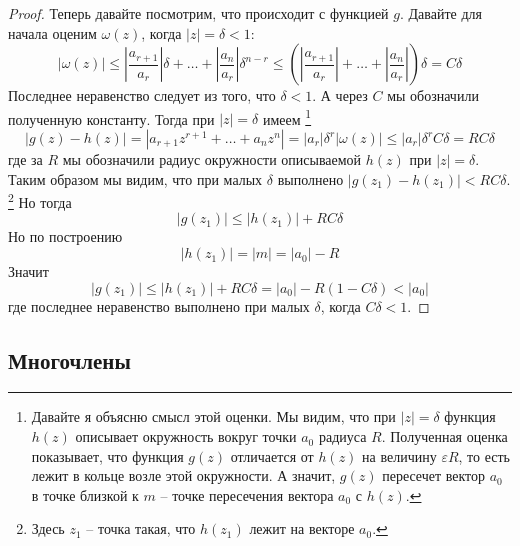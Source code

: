 \begin{proof}
Теперь давайте посмотрим, что происходит с функцией $g$.
Давайте для начала оценим $\omega(z)$, когда $|z| = \delta < 1$:
\[
|\omega(z)| \leqslant \left| \frac{a_{r+1}}{a_r}\right| \delta + \ldots + \left|\frac{a_n}{a_r}\right| 
\delta^{n-r}\leqslant \left(\left| \frac{a_{r+1}}{a_r}\right|  + \ldots + \left|\frac{a_n}{a_r}\right|\right) 
\delta = C \delta
\]
Последнее неравенство следует из того, что $\delta < 1$.
А через $C$ мы обозначили полученную константу.
Тогда при $|z| = \delta$ имеем%
\footnote{Давайте я объясню смысл этой оценки.
Мы видим, что при $|z| = \delta$ функция $h(z)$ описывает окружность вокруг точки $a_0$ радиуса $R$.
Полученная оценка показывает, что функция $g(z)$ отличается от $h(z)$ на величину $\varepsilon R$, то есть лежит в кольце возле этой окружности.
А значит, $g(z)$ пересечет вектор $a_0$ в точке близкой к $m$ -- точке пересечения вектора $a_0$ с $h(z)$.}
\[
|g(z) - h(z)| = \left|a_{r+1}z^{r+1} + \ldots + a_n z^n \right|= |a_r|
\delta^r \left|\omega(z)\right| \leqslant |a_r|\delta^{r}C \delta = R C \delta
\]
где за $R$ мы обозначили радиус окружности описываемой $h(z)$ при $|z| = \delta$.
Таким образом мы видим, что при малых $\delta$ выполнено $|g(z_1) - h(z_1)| < RC\delta$.%
\footnote{Здесь $z_1$ -- точка такая, что $h(z_1)$ лежит на векторе $a_0$.}
Но тогда
\[
|g(z_1)| \leqslant |h(z_1)| + RC \delta
\]
Но по построению
\[
|h(z_1)| = |m| = |a_0| - R
\]
Значит
\[
|g(z_1)| \leqslant |h(z_1)| + RC \delta = |a_0| - R(1 - C\delta) < |a_0|
\]
где последнее неравенство выполнено при малых $\delta$, когда $C\delta < 1$.
\end{proof}

\subsection{Многочлены}


